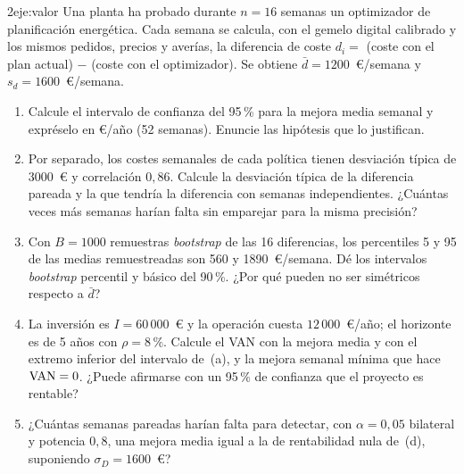 \begin{ejercicio}{2}{eje:valor}
Una planta ha probado durante $n=16$ semanas un optimizador de planificación energética. Cada semana se calcula, con el gemelo digital calibrado y los mismos pedidos, precios y averías, la diferencia de coste $d_i=$ (coste con el plan actual) $-$ (coste con el optimizador). Se obtiene $\bar d=1200$~€/semana y $s_d=1600$~€/semana.
\begin{enumerate}[label=(\alph*)]
  \item {} Calcule el intervalo de confianza del 95\,\% para la mejora media semanal y expréselo en €/año (52 semanas). Enuncie las hipótesis que lo justifican.
  \item {} Por separado, los costes semanales de cada política tienen desviación típica de 3000~€ y correlación $0{,}86$. Calcule la desviación típica de la diferencia pareada y la que tendría la diferencia con semanas independientes. ¿Cuántas veces más semanas harían falta sin emparejar para la misma precisión?
  \item {} Con $B=1000$ remuestras \emph{bootstrap} de las 16 diferencias, los percentiles 5 y 95 de las medias remuestreadas son 560 y 1890~€/semana. Dé los intervalos \emph{bootstrap} percentil y básico del 90\,\%. ¿Por qué pueden no ser simétricos respecto a $\bar d$?
  \item {} La inversión es $I=60\,000$~€ y la operación cuesta $12\,000$~€/año; el horizonte es de 5 años con $\rho=8\,\%$. Calcule el VAN con la mejora media y con el extremo inferior del intervalo de~(a), y la mejora semanal mínima que hace $\mathrm{VAN}=0$. ¿Puede afirmarse con un 95\,\% de confianza que el proyecto es rentable?
  \item {} ¿Cuántas semanas pareadas harían falta para detectar, con $\alpha=0{,}05$ bilateral y potencia $0{,}8$, una mejora media igual a la de rentabilidad nula de~(d), suponiendo $\sigma_D=1600$~€?
\end{enumerate}
\end{ejercicio}
